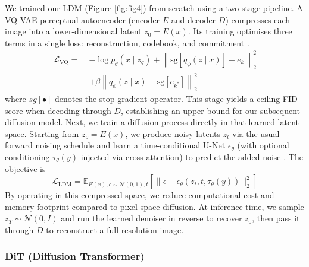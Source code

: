 \documentclass[conference]{IEEEtran}
\begin{document}
We trained our LDM (Figure \ref{fig:fig4}) from scratch using a two-stage pipeline. A VQ-VAE perceptual autoencoder (encoder $E$ and decoder $D$) compresses each image into a lower-dimensional latent $z_0 = E(x)$. Its training optimises three terms in a single loss: reconstruction, codebook, and commitment  \cite{razaviGeneratingDiverseHighFidelity2019}.
\begin{equation*}
\begin{aligned}
\mathcal{L}_{\mathrm{VQ}} =\;&
-\log p_{\theta}(x \mid z_q) 
+ \left\| \mathrm{sg}[q_{\phi}(z \mid x)] - e_k \right\|_2^2 \\
&+ \beta \left\| q_{\phi}(z \mid x) - \mathrm{sg}[e_{k^*}] \right\|_2^2
\end{aligned}
\end{equation*}
where $sg[\bullet]$ denotes the stop-gradient operator. This stage yields a ceiling FID score when decoding through $D$, establishing an upper bound for our subsequent diffusion model. Next, we train a diffusion process directly in that learned latent space. Starting from $z_o = E(x)$, we produce noisy latents $z_t$ via the usual forward noising schedule and learn a time-conditional U-Net $\epsilon_\theta$ (with optional conditioning $\tau_\theta(y)$ injected via cross-attention) to predict the added noise \cite{rombachHighResolutionImageSynthesis2022}. The objective is
$$
\mathcal{L}_{\text{LDM}} = \mathbb{E}_{E(x), \epsilon \sim \mathcal{N}(0,1), t} \left[ \| \epsilon - \epsilon_\theta(z_t, t, \tau_\theta(y)) \|_2^2 \right]
$$
By operating in this compressed space, we reduce computational cost and memory footprint compared to pixel-space diffusion. At inference time, we sample $z_T\sim\mathcal{N}(0,I)$  and run the learned denoiser in reverse to recover $z_0$, then pass it through $D$ to reconstruct a full-resolution image.

\subsubsection{DiT (Diffusion Transformer)}\label{dit}
\end{document}
